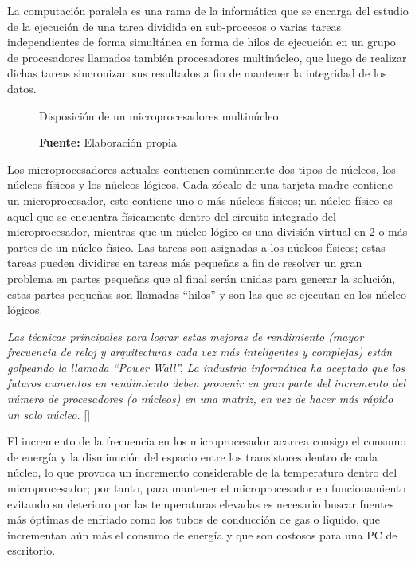 \documentclass[../main/main.tex]{subfiles}
\begin{document}
  La computación paralela es una rama de la informática que se encarga del estudio de la ejecución de una tarea dividida en sub-procesos o varias tareas independientes de forma simultánea en forma de hilos de ejecución en un grupo de procesadores llamados también procesadores multinúcleo, que luego de realizar dichas tareas sincronizan sus resultados a fin de mantener la integridad de los datos.

  \begin{figure}[H]
    \centering
    \caption{Disposición de un microprocesadores multinúcleo}
    
    \caption*{\textbf{Fuente:} Elaboración propia}
  \end{figure}

  Los microprocesadores actuales contienen comúnmente dos tipos de núcleos, los núcleos físicos y los núcleos lógicos. Cada zócalo de una tarjeta madre contiene un microprocesador, este contiene uno o más núcleos físicos; un núcleo físico es aquel que se encuentra físicamente dentro del circuito integrado del microprocesador, mientras que un núcleo lógico es una división virtual en 2 o más partes de un núcleo físico. Las tareas son asignadas a los núcleos físicos; estas tareas pueden dividirse en tareas más pequeñas a fin de resolver un gran problema en partes pequeñas que al final serán unidas para generar la solución, estas partes pequeñas son llamadas ``hilos'' y son las que se ejecutan en los núcleo lógicos.

  \textit{Las técnicas principales para lograr estas mejoras de rendimiento (mayor frecuencia de reloj y arquitecturas cada vez más inteligentes y complejas) están golpeando la llamada ``Power Wall''. La industria informática ha aceptado que los futuros aumentos en rendimiento deben provenir en gran parte del incremento del número de procesadores (o núcleos) en una matriz, en vez de hacer más rápido un solo núcleo.} [\cite[p.~6]{report:parallel_computing_illinois}]

  El incremento de la frecuencia en los microprocesador acarrea consigo el consumo de energía y la disminución del espacio entre los transistores dentro de cada núcleo, lo que provoca un incremento considerable de la temperatura dentro del microprocesador; por tanto, para mantener el microprocesador en funcionamiento evitando su deterioro por las temperaturas elevadas es necesario buscar fuentes más óptimas de enfriado como los tubos de conducción de gas o líquido, que incrementan aún más el consumo de energía y que son costosos para una PC de escritorio.
\end{document}
